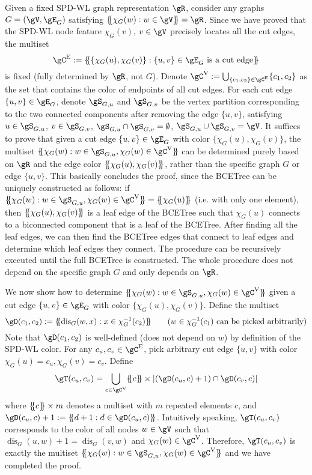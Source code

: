 \documentclass{article} %
\newcommand*{\ldblbrace}{\{\mskip-5mu\{}
\newcommand*{\rdblbrace}{\}\mskip-5mu\}}
\newcommand*{\dis}{{\operatorname{dis}}}
\begin{document}
Given a fixed SPD-WL graph representation $\gR$, consider any graphs $G=(\gV,\gE_G)$ satisfying $\ldblbrace\chi_G(w):w\in\gV\rdblbrace=\gR$. Since we have proved that the SPD-WL node feature $\chi_G(v)$, $v\in\gV$ precisely locates all the cut edges, the multiset $$\gC^\mathrm{E}:=\ldblbrace\{\chi_G(u),\chi_G(v)\}:\{u,v\}\in\gE_G \text{ is a cut edge}\rdblbrace$$
is fixed (fully determined by $\gR$, not $G$). Denote $\gC^\mathrm{V}:=\bigcup_{\{c_1,c_2\}\in\gC^\mathrm{E}}\{c_1,c_2\}$
as the set that contains the color of endpoints of all cut edges. For each cut edge $\{u,v\}\in\gE_G$, denote $\gS_{G,u}$ and $\gS_{G,v}$ be the vertex partition corresponding to the two connected components after removing the edge $\{u,v\}$, satisfying $u\in\gS_{G,u}$, $v\in\gS_{G,v}$, $\gS_{G,u}\cap\gS_{G,v}=\emptyset$, $\gS_{G,u}\cup\gS_{G,v}=\gV$. It suffices to prove that given a cut edge $\{u,v\}\in\gE_G$ with color $\{\chi_G(u),\chi_G(v)\}$, the multiset $\ldblbrace \chi_G(w):w\in \gS_{G,u},\chi_G(w)\in\gC^\mathrm{V}\rdblbrace$ can be determined purely based on $\gR$ and the edge color $\ldblbrace\chi_G(u),\chi_G(v)\rdblbrace$, rather than the specific graph $G$ or edge $\{u,v\}$. This basically concludes the proof, since the BCETree can be uniquely constructed as follows: if $\ldblbrace \chi_G(w):w\in \gS_{G,u},\chi_G(w)\in\gC^\mathrm{V}\rdblbrace=\ldblbrace\chi_G(u)\rdblbrace$ (i.e. with only one element), then $\ldblbrace\chi_G(u),\chi_G(v)\rdblbrace$ is a leaf edge of the BCETree such that $\chi_G(u)$ connects to a biconnected component that is a leaf of the BCETree. After finding all the leaf edges, we can then find the BCETree edges that connect to leaf edges and determine which leaf edges they connect. The procedure can be recursively executed until the full BCETree is constructed. The whole procedure does not depend on the specific graph $G$  and only depends on $\gR$.

We now show how to determine $\ldblbrace \chi_G(w):w\in \gS_{G,u},\chi_G(w)\in\gC^\mathrm{V}\rdblbrace$ given a cut edge $\{u,v\}\in\gE_G$ with color $\{\chi_G(u),\chi_G(v)\}$. Define the multiset
\begin{equation}
    \gD(c_1,c_2):=\ldblbrace \dis_G(w,x):x\in\chi_G^{-1}(c_2) \rdblbrace\tag{$w\in\chi_G^{-1}(c_1)$ can be picked arbitrarily}
\end{equation}
Note that $\gD(c_1,c_2)$ is well-defined (does not depend on $w$) by definition of the SPD-WL color. For any $c_u,c_v\in\gC^\mathrm{E}$, pick arbitrary cut edge $\{u,v\}$ with color $\chi_G(u)=c_u,\chi_G(v)=c_v$. Define
\begin{equation}
    \gT(c_u,c_v)=\bigcup_{c\in\gC^\mathrm{V}}\ldblbrace c\rdblbrace\times |(\gD(c_u,c)+1)\cap\gD(c_v,c)|
\end{equation}
where $\ldblbrace c\rdblbrace\times m$ denotes a multiset with $m$ repeated elements $c$, and $\gD(c_u,c)+1:=\ldblbrace d+1:d\in\gD(c_u,c)\rdblbrace$. Intuitively speaking, $\gT(c_u,c_v)$ corresponds to the color of all nodes $w\in\gV$ such that $\dis_G(u,w)+1=\dis_G(v,w)$ and $\chi_G(w)\in\gC^\mathrm{V}$. Therefore, $\gT(c_u,c_v)$ is exactly the multiset $\ldblbrace \chi_G(w):w\in \gS_{G,u},\chi_G(w)\in\gC^\mathrm{V}\rdblbrace$ and we have completed the proof.
\end{document}

